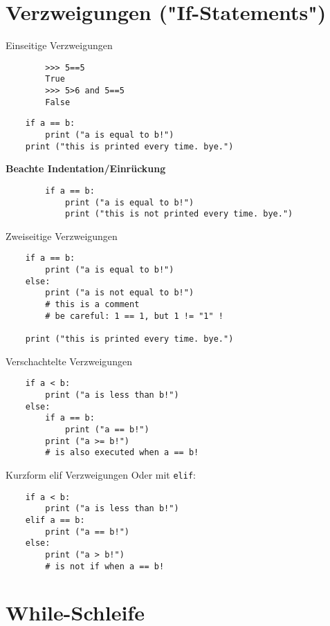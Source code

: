 \section{Verzweigungen ("{}If-Statements"{})}
\begin{frame}[fragile]{Einseitige Verzweigungen}
	\begin{lstlisting}
		>>> 5==5
		True
		>>> 5>6 and 5==5
		False
	\end{lstlisting}
	\pause
    \begin{lstlisting}
    if a == b:
        print ("a is equal to b!")
    print ("this is printed every time. bye.")
    \end{lstlisting}
	\pause
	\textbf{Beachte Indentation/Einrückung}
	\begin{lstlisting}
		if a == b:
			print ("a is equal to b!")
			print ("this is not printed every time. bye.")
	\end{lstlisting}
\end{frame}

\begin{frame}[fragile]{Zweiseitige Verzweigungen}
    \begin{lstlisting}
    if a == b:
        print ("a is equal to b!")
    else:
        print ("a is not equal to b!")
        # this is a comment
        # be careful: 1 == 1, but 1 != "1" !
    
    print ("this is printed every time. bye.")
    \end{lstlisting}
\end{frame}

\begin{frame}[fragile]{Verschachtelte Verzweigungen}
    \begin{lstlisting}
    if a < b:
        print ("a is less than b!")
    else:
        if a == b:
            print ("a == b!")
        print ("a >= b!")
        # is also executed when a == b! 
    \end{lstlisting}
\end{frame}

\begin{frame}[fragile]{Kurzform elif Verzweigungen}
    Oder mit \texttt{elif}:
    \begin{lstlisting}
    if a < b:
        print ("a is less than b!")
    elif a == b:
        print ("a == b!")
    else:
        print ("a > b!")
        # is not if when a == b! 
    \end{lstlisting}
\end{frame}

\section{While-Schleife}

